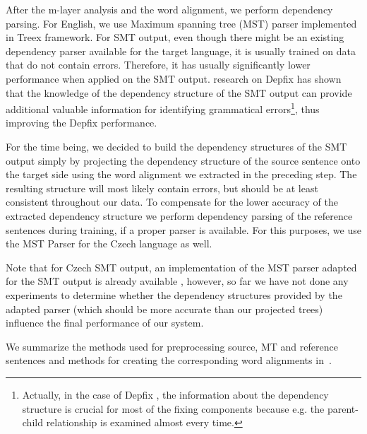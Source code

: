 After the m-layer analysis and the word alignment, we perform dependency parsing.
For English, we use Maximum spanning tree (MST) parser \citep{mcdonald:pereira:ribarov:hajic:2005}
implemented in Treex framework. For SMT output, even though there might
be an existing dependency parser available for the target language, it is usually
trained on data that do not contain errors. Therefore, it has usually significantly
lower performance when applied on the SMT output.  research on Depfix has shown
that the knowledge of the dependency structure of the SMT output can provide additional
valuable information for identifying grammatical errors\footnote{Actually, in the case of Depfix
, the information about the dependency structure is crucial for most of the fixing components
because e.g. the parent-child relationship is examined almost every time.}, thus improving
the Depfix performance.

For the time being, we decided to build the dependency structures of the SMT output simply
by projecting the dependency structure of the source sentence onto the target side
using the word alignment we extracted in the preceding step. The resulting structure
will most likely contain errors, but should be at least consistent throughout our data.
To compensate for the lower accuracy of the extracted dependency structure we perform
dependency parsing of the reference sentences during training, if a proper parser
is available. For this purposes, we use the MST Parser for the Czech language as well.

Note that for Czech SMT output, an implementation of the MST parser adapted for the SMT output
is already available \citep{biblio:RoDuUsingParallel2012}, however, so far we have not done any experiments
to determine whether the dependency structures provided by the adapted parser (which
should be more accurate than our projected trees) influence the final performance of our system.

We summarize the methods used for preprocessing source, MT and reference sentences and methods
for creating the corresponding word alignments in~.

